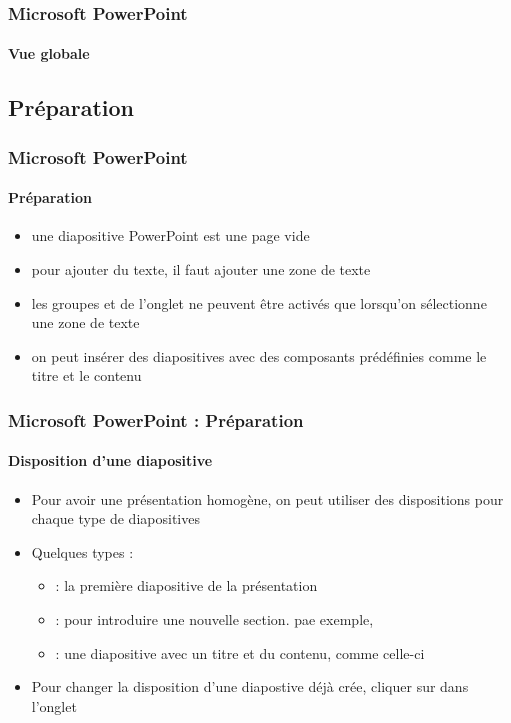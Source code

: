 \documentclass[xcolor=table, usenames,dvipsnames]{beamer}
\begin{document}
\begin{frame}
\frametitle{Microsoft PowerPoint}
\framesubtitle{Vue globale}

\begin{center}
\end{center}

\end{frame}

\subsection{Préparation}

\begin{frame}
\frametitle{Microsoft PowerPoint}
\framesubtitle{Préparation}

\begin{itemize}
	\item une diapositive PowerPoint est une page vide 
	\item pour ajouter du texte, il faut ajouter une zone de texte
	\item les groupes  et  de l'onglet  ne peuvent être activés que lorsqu'on sélectionne une zone de texte 
	\item on peut insérer des diapositives avec des composants prédéfinies comme le titre et le contenu
\end{itemize}

\end{frame}

\begin{frame}
\frametitle{Microsoft PowerPoint : Préparation}
\framesubtitle{Disposition d'une diapositive}

\begin{minipage}{0.60\textwidth}
	\begin{itemize}
		\item Pour avoir une présentation homogène, on peut utiliser des dispositions pour chaque type de diapositives
		\item Quelques types : 
		\begin{itemize}
			\item {} : la première diapositive de la présentation
			\item {} : pour introduire une nouvelle section. pae exemple, 
			\item {} : une diapositive avec un titre et du contenu, comme celle-ci
		\end{itemize}
		\item Pour changer la disposition d'une diapostive déjà crée, cliquer sur  dans l'onglet 
	\end{itemize}
\end{minipage}
%
\begin{minipage}{0.39\textwidth}
\end{minipage}

\end{frame}
\end{document}
